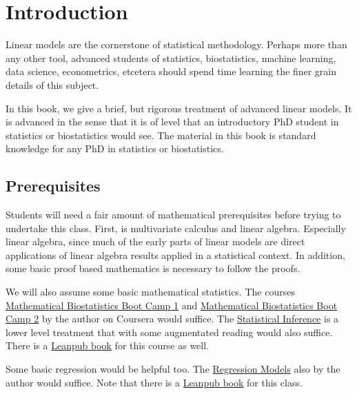 \chapter{Introduction}


Linear models are the cornerstone of statistical methodology.
Perhaps more than any other tool, advanced students of
statistics, biostatistics, machine learning, data science,
econometrics, etcetera should spend time learning the
finer grain details of this subject.

In this book, we give a brief, but rigorous 
treatment of advanced linear models.
It is advanced in the sense that it is of level that an
introductory PhD student in statistics or biostatistics
would see. The material in this book is standard
knowledge for any PhD in statistics or biostatistics. 

\section{Prerequisites}

Students will need a fair amount of mathematical prerequisites
before trying to undertake this class. First, is multivariate
calculus and linear algebra. Especially linear algebra, since
much of the early parts of linear models are direct applications
of linear algebra results applied in a statistical context.
In addition, some basic proof based mathematics is necessary
to follow the proofs.

We will also assume some basic mathematical statistics. The
courses \href{https://www.coursera.org/course/biostats}{Mathematical Biostatistics Boot Camp 1}
and \href{https://www.coursera.org/course/biostats2}{Mathematical Biostatistics Boot Camp 2}
by the author on Coursera would suffice. The \href{https://www.coursera.org/course/statinference}{Statistical Inference} is a lower level
treatment that with some augmentated reading would also suffice.
There is a \href{https://leanpub.com/LittleInferenceBook}{Leanpub book} for
this course as well.

Some basic regression would
be helpful too. The \href{https://www.coursera.org/course/regmods}{Regression Models}
also by the author would suffice. Note that there is a
\href{https://leanpub.com/regmods/}{Leanpub book} for this class. 
